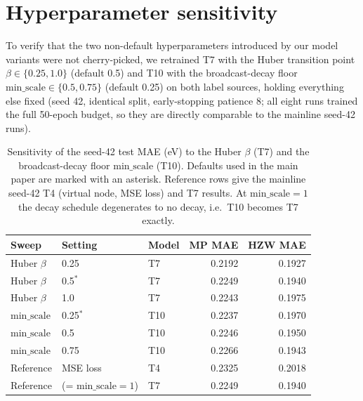 \documentclass[a4paper,10pt]{article}
\begin{document}
\section{Hyperparameter sensitivity}

To verify that the two non-default hyperparameters introduced by our model variants were not cherry-picked, we retrained T7 with the Huber transition point \(\beta\in\{0.25, 1.0\}\) (default 0.5) and T10 with the broadcast-decay floor \(\mathrm{min\_scale}\in\{0.5, 0.75\}\) (default 0.25) on both label sources, holding everything else fixed (seed 42, identical split, early-stopping patience 8; all eight runs trained the full 50-epoch budget, so they are directly comparable to the mainline seed-42 runs).

\begin{table}[htbp]
\centering
\caption{Sensitivity of the seed-42 test MAE (eV) to the Huber \(\beta\) (T7) and the broadcast-decay floor \(\mathrm{min\_scale}\) (T10). Defaults used in the main paper are marked with an asterisk. Reference rows give the mainline seed-42 T4 (virtual node, MSE loss) and T7 results. At \(\mathrm{min\_scale}=1\) the decay schedule degenerates to no decay, i.e.\ T10 becomes T7 exactly.}
\label{tab:sensitivity}
\small
\begin{tabular}{l l l r r}
\toprule
Sweep & Setting & Model & MP MAE & HZW MAE \\
\midrule
Huber \(\beta\) & 0.25          & T7  & 0.2192 & 0.1927 \\
Huber \(\beta\) & 0.5\(^{*}\)   & T7  & 0.2249 & 0.1940 \\
Huber \(\beta\) & 1.0           & T7  & 0.2243 & 0.1975 \\
\midrule
\(\mathrm{min\_scale}\) & 0.25\(^{*}\) & T10 & 0.2237 & 0.1970 \\
\(\mathrm{min\_scale}\) & 0.5          & T10 & 0.2246 & 0.1950 \\
\(\mathrm{min\_scale}\) & 0.75         & T10 & 0.2266 & 0.1943 \\
\midrule
Reference & MSE loss & T4 & 0.2325 & 0.2018 \\
Reference & (= \(\mathrm{min\_scale}=1\)) & T7 & 0.2249 & 0.1940 \\
\bottomrule
\end{tabular}
\end{table}
\end{document}
